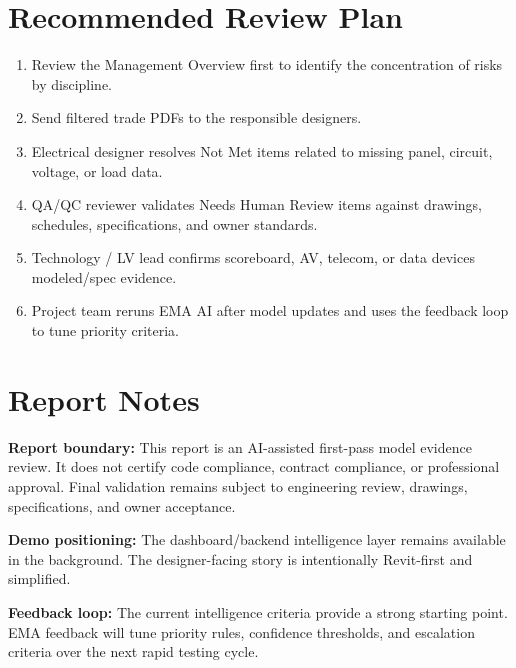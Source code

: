 \documentclass[10pt,letterpaper]{article}
\begin{document}
\section*{Recommended Review Plan}

\begin{tcolorbox}[colback=emaSoft]
\begin{enumerate}
  \item Review the Management Overview first to identify the concentration of risks by discipline.
  \item Send filtered trade PDFs to the responsible designers.
  \item Electrical designer resolves Not Met items related to missing panel, circuit, voltage, or load data.
  \item QA/QC reviewer validates Needs Human Review items against drawings, schedules, specifications, and owner standards.
  \item Technology / LV lead confirms scoreboard, AV, telecom, or data devices modeled/spec evidence.
  \item Project team reruns EMA AI after model updates and uses the feedback loop to tune priority criteria.
\end{enumerate}
\end{tcolorbox}

\section*{Report Notes}

\begin{tcolorbox}[colback=white]
\small
\textbf{Report boundary:} This report is an AI-assisted first-pass model evidence review. It does not certify code compliance, contract compliance, or professional approval. Final validation remains subject to engineering review, drawings, specifications, and owner acceptance.

\vspace{4pt}
\textbf{Demo positioning:} The dashboard/backend intelligence layer remains available in the background. The designer-facing story is intentionally Revit-first and simplified.

\vspace{4pt}
\textbf{Feedback loop:} The current intelligence criteria provide a strong starting point. EMA feedback will tune priority rules, confidence thresholds, and escalation criteria over the next rapid testing cycle.
\end{tcolorbox}
\end{document}
